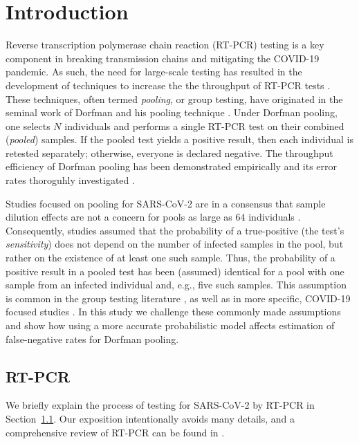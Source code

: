 \documentclass{article}
\begin{document}
\section{Introduction}
Reverse transcription polymerase chain reaction (RT-PCR) testing is a
key component in breaking transmission chains and mitigating the
COVID-19 pandemic. As such, the need for large-scale testing has
resulted in the development of techniques to increase the the
throughput of RT-PCR tests \cite{DorfmanYuvalDor, PoolSize30,
  BayesianDorfman, MatrixPooling, LionDorfman}. These techniques,
often termed \emph{pooling}, or group testing, have originated in the
seminal work of Dorfman and his pooling technique
\cite{DorfmanOriginal, DorfmanYuvalDor}. Under Dorfman pooling, one
selects $N$ individuals and performs a single RT-PCR test on their
combined (\emph{pooled}) samples. If the pooled test yields a positive
result, then each individual is retested separately; otherwise,
everyone is declared negative. The throughput efficiency of Dorfman
pooling has been demonstrated empirically \cite{DorfmanYuvalDor} and
its error rates thoroguhly investigated \cite{Kim, Simplistic1,
  OptimalDorfmanPool}.

Studies focused on pooling for SARS-CoV-2 are in a consensus that
sample dilution effects \cite{DilutionHIV, GroupDilution} are not a
concern for pools as large as 64 individuals \cite{PoolSize30, Lion,
  DorfmanYuvalDor, DilutionCOVID}. Consequently, studies assumed that
the probability of a true-positive (the test's \emph{sensitivity})
does not depend on the number of infected samples in the pool, but
rather on the existence of at least one such sample. Thus, the
probability of a positive result in a pooled test has been (assumed)
identical for a pool with one sample from an infected individual and,
e.g., five such samples. This assumption is common in the group
testing literature \cite{Kim, OptimalDorfmanPool}, as well as in more
specific, COVID-19 focused studies \cite{Simplistic1, Simplistic2}. In
this study we challenge these commonly made assumptions and show how
using a more accurate probabilistic model affects estimation of
false-negative rates for Dorfman pooling.

\subsection{RT-PCR}\label{subsec:rtpcr}
We briefly explain the process of testing for SARS-CoV-2 by RT-PCR in
Section~\ref{subsec:rtpcr}. Our exposition intentionally avoids many
details, and a comprehensive review of RT-PCR can be found in
\cite{COVID-RTPCR, PCRBook}.
\end{document}
